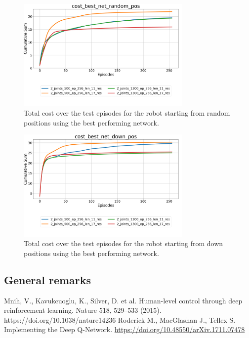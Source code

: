 \documentclass[twocolumn, a4paper]{article}
\begin{document}
\begin{figure}[H]
	\centering
	\includegraphics[width=8.5cm]{"../Figures/Summary_cost_best_net_random_pos_2J.png"}
	\caption{Total cost over the test episodes for the robot starting from
			 random positions using the best performing network.}
	\label{fig:Test_2_best_net_random_pos}
\end{figure}
\vspace{-1cm}
\begin{figure}[H]
	\centering
	\includegraphics[width=8.5cm]{"../Figures/Summary_cost_best_net_down_pos_2J.png"}
	\caption{Total cost over the test episodes for the robot starting from
			 down positions using the best performing network.}
	\label{fig:Test_2_best_net_down_pos}
\end{figure}\subsection{General remarks}
\newpage

\begin{thebibliography}{9}
	Mnih, V., Kavukcuoglu, K., Silver, D. et al. Human-level control through
	deep reinforcement learning. Nature 518, 529–533 (2015).
	https://doi.org/10.1038/nature14236
	Roderick M., MacGlashan J., Tellex S. Implementing the Deep Q-Network.
	\href{https://doi.org/10.48550/arXiv.1711.07478}
		 {https://doi.org/10.48550/arXiv.1711.07478}
\end{thebibliography}
\end{document}

